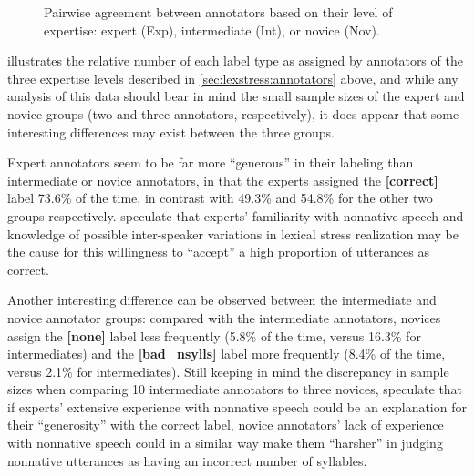\begin{figure}[p]
			\caption[Pairwise agreement statistics by annotator expertise]{Pairwise agreement between annotators based on their level of expertise: expert (Exp), intermediate (Int), or novice (Nov). 
			}
			\label{fig:agreement:expertise}
		\end{figure}
		
			 illustrates the relative number of each label type as assigned by annotators of the three expertise levels described in \cref{sec:lexstress:annotators} above, and while any analysis of this data should bear in mind the small sample sizes of the expert and novice groups (two and three annotators, respectively), it does appear that some interesting differences may exist between the three groups. 
			
			Expert annotators seem to be far more ``generous'' in their labeling than intermediate or novice annotators, in that the experts assigned the \textbf{[correct]} label 73.6\% of the time, in contrast with 49.3\% and 54.8\% for the other two groups respectively.  speculate that experts' familiarity with nonnative speech and knowledge of possible inter-speaker variations in lexical stress realization may be the cause for this willingness to ``accept'' a high proportion of utterances as correct. 
			
			Another interesting difference can be observed between the intermediate and novice annotator groups: compared with the intermediate annotators, novices assign the \textbf{[none]} label less frequently (5.8\% of the time, versus 16.3\% for intermediates) and the \textbf{[bad\_nsylls]} label more frequently (8.4\% of the time, versus 2.1\% for intermediates). Still keeping in mind the discrepancy in sample sizes when comparing 10 intermediate annotators to three novices,  speculate that if experts' extensive experience with nonnative speech could be an explanation for their ``generosity'' with the correct label, novice annotators' lack of experience with nonnative speech could in a similar way make them ``harsher'' in judging nonnative utterances as having an incorrect number of syllables. %
			
